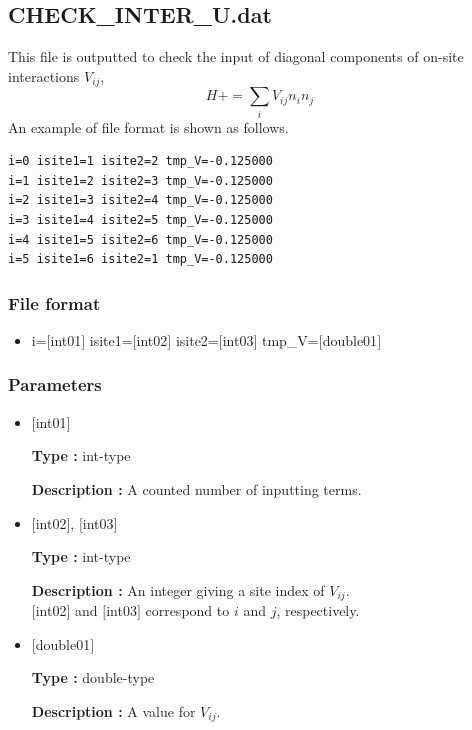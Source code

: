 \newpage
\subsection{CHECK\_INTER\_U.dat}
This file is outputted to check the input of diagonal components of on-site interactions $V_{ij}$,
\begin{equation}
H+=\sum_{i} V_{ij} n_{i} n_{j}
\end{equation}
An example of file format is shown as follows.

\begin{minipage}{12.5cm}
\begin{screen}
\begin{verbatim}
i=0 isite1=1 isite2=2 tmp_V=-0.125000 
i=1 isite1=2 isite2=3 tmp_V=-0.125000 
i=2 isite1=3 isite2=4 tmp_V=-0.125000 
i=3 isite1=4 isite2=5 tmp_V=-0.125000 
i=4 isite1=5 isite2=6 tmp_V=-0.125000 
i=5 isite1=6 isite2=1 tmp_V=-0.125000 
\end{verbatim}
\end{screen}
\end{minipage}

\subsubsection{File format}
 \begin{itemize}
   \item  i=$[$int01$]$ isite1=$[$int02$]$ isite2=$[$int03$]$ tmp\_V=$[$double01$]$ 
 \end{itemize}
 
\subsubsection{Parameters}
 \begin{itemize}

    \item  $[$int01$]$ 
   
    {\bf Type :} int-type

   {\bf Description :} A counted number of inputting terms.
      
   \item  $[$int02$]$, $[$int03$]$
   
    {\bf Type :} int-type

    {\bf Description :}  An integer giving a site index of $V_{ij}$. \\
    $[$int02$]$ and $[$int03$]$ correspond to $i$ and $j$, respectively.
 
   \item  $[$double01$]$ 
   
    {\bf Type :} double-type

   {\bf Description :} A value for $V_{ij}$.
\end{itemize}


